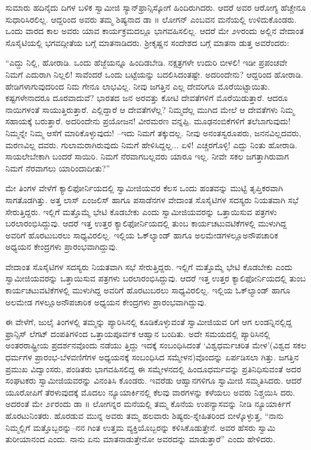  ಸುಮಾರು ಹದಿನೈದು ದಿಗಳ ಬಳಿಕ ಸ್ವಾಮೀಜಿ ಸ್ಯಾನ್​ಫ್ರಾನ್ಸಿಸ್ಕೋಗೆ ಹಿಂದಿರುಗಿದರು. ಆದರೆ ಅವರ ಆರೋಗ್ಯ ಹೆಚ್ಚೇನೂ ಸುಧಾರಿಸಿರಲಿಲ್ಲ. ಆದ್ದರಿಂದ ಅವರು ತಮ್ಮ ಶಿಷ್ಯನಾದ ಡಾ ॥ ಲೋಗನ್ ಎಂಬವನ ಮನೆಯಲ್ಲಿ ಉಳಿದುಕೊಂಡರು. ಒಂದು ವಾರದ ಕಾಲ ಅವರು ಯಾವ ಕಾರ್ಯಕ್ರಮದಲ್ಲೂ ಭಾಗವಹಿಸಲಿಲ್ಲ. ಆದರೆ ಮೇ ೨೪ರಂದು ಅಲ್ಲಿನ ವೇದಾಂತ ಸೊಸೈಟಿಯಲ್ಲಿ ಭಗವದ್ಗೀತೆಯ ಬಗ್ಗೆ ಮಾತನಾಡಿದರು. ಶ್ರೀಕೃಷ್ಣನ ಸಂದೇಶದ ಬಗ್ಗೆ ಮಾತನಾ ಡುತ್ತ ಅವರೆಂದರು:

“ಎದ್ದು ನಿಲ್ಲಿ, ಹೋರಾಡಿ. ಒಂದು ಹೆಜ್ಜೆಯನ್ನೂ ಹಿಂದಿಡಬೇಡಿ. ನಕ್ಷತ್ರಗಳೇ ಉದುರಿ ಬೀಳಲಿ! ಇಡೀ ಪ್ರಪಂಚವೇ ನಿಮಗೆ ಎದುರಾಗಿ ನಿಲ್ಲಲಿ! ಸಾವೆಂದರೆ ಒಂದು ಬಟ್ಟೆಯನ್ನು ಬದಲಿಸಿದಂತಷ್ಟೇ. ಅದರಿಂದೇನು? ಆದ್ದರಿಂದ ಹೋರಾಡಿ. ಹೇಡಿಗಳಾಗುವುದರಿಂದ ನಿಮ ಗೇನೂ ಲಾಭವಿಲ್ಲ. ನೀವು ಜಗತ್ತಿನ ಎಲ್ಲ ದೇವರಿಗೂ ಮೊರೆಯಿಟ್ಟಾಯಿತು. ಕಷ್ಟಗಳೇನಾದರೂ ದೂರವಾದುವೆ? ಭಾರತದ ಜನ ಅರವತ್ತು ಕೋಟಿ ದೇವತೆಗಳಿಗೆ ಮೊರೆಯಿಡುತ್ತಾರೆ. ಆದರೂ ನಾಯಿಗಳಂತೆ ಸಾಯುತ್ತಿರುತ್ತಾರೆ. ಎಲ್ಲಿದ್ದಾರೆ ಆ ದೇವತೆಗಳೆಲ್ಲ? ನಿಮ್ಮದೆಲ್ಲ ಮುಗಿದ ಮೇಲೆ ಆ ದೇವತೆಗಳು ನಿಮ್ಮ ಸಹಾಯಕ್ಕೆ ಬರುತ್ತಾರೆ. ಅದರಿಂದೇನು ಪ್ರಯೋಜನ! ವೀರಮರಣ ವನ್ನಪ್ಪಿ. ಮೂಢನಂಬಿಕೆಗಳಿಗೆ ತಲೆಬಾಗುವುದು! ನಿಮ್ಮನ್ನೇ ನಿಮ್ಮ ಆಸೆಗೆ ಮಾರಿಕೊಳ್ಳುವುದು! –ಇದು ನಿಮಗೆ ತಕ್ಕುದಲ್ಲ. ನೀವು ಅನಂತಸ್ವರೂಪರು, ಜನನವಿಲ್ಲದವರು, ಮರಣವಿಲ್ಲ ದವರು. ಗುಲಾಮರಾಗಿರುವುದು ನಿಮಗೆ ಹೇಳಿಸಿದ್ದಲ್ಲ... ಏಳಿ! ಎಚ್ಚರಗೊಳ್ಳಿ! ಎದ್ದು ನಿಂತು ಹೋರಾಡಿ. ಸಾಯಲೇಬೇಕಾಗಿ ಬಂದರೆ ಸಾಯಿರಿ. ನಿಮಗೆ ನೆರವಾಗಬಲ್ಲವರು ಯಾರೂ ಇಲ್ಲ. ನೀವೇ ಸಕಲ ಜಗತ್ತಾಗಿರುವಾಗ ನಿಮಗೆ ನೆರವಾಗಲು ಯಾರಿಂದಾದೀತು?”

ಮೇ ತಿಂಗಳ ವೇಳೆಗೆ ಕ್ಯಾಲಿಫೋರ್ನಿಯದಲ್ಲಿ ಸ್ವಾಮೀಜಿಯವರ ಕೆಲಸ ಒಂದು ಹಂತವನ್ನು ಮುಟ್ಟಿ ತೃಪ್ತಿಕರವಾಗಿ ಸಾಗತೊಡಗಿತ್ತು. ಅತ್ತ ಲಾಸ್ ಏಂಜಲಿಸ್ ಹಾಗೂ ಪಸಾಡೆನಗಳ ವೇದಾಂತ ಸೊಸೈಟಿಗಳ ಸದಸ್ಯರು ನಿಯತವಾಗಿ ಸಭೆ ಸೇರುತ್ತಿದ್ದರು. ಇಲ್ಲಿಗೆ ಮತ್ತೊಮ್ಮೆ ಭೇಟಿ ಕೊಡಬೇಕು ಎಂದು ಸ್ವಾಮೀಜಿಯವರನ್ನು ಒತ್ತಾಯಿಸುವ ಪತ್ರಗಳು ಬರಲಾರಂಭಿಸಿದ್ದುವು. ಆದರೆ ಇತ್ತ ಉತ್ತರ ಕ್ಯಾಲಿಫೋರ್ನಿಯದಲ್ಲಿ ತುಂಬ ಕಾರ್ಯಚಟುವಟಿಕೆಗಳಲ್ಲಿ ಮುಳುಗಿದ್ದ ಅವರಿಗೆ ಹೊರಟುಬರಲು ಸಾಧ್ಯವಿರಲಿಲ್ಲ. ಇಲ್ಲಿಯ ಓಕ್​ಲ್ಯಾಂಡ್ ಹಾಗೂ ಅಲಮೇಡಗಳಲ್ಲೂಅನೌಪಚಾರಿಕ ಅಧ್ಯಯನ ಕೇಂದ್ರಗಳು ಪ್ರಾರಂಭವಾಗಿದ್ದುವು.

\noindent

ವೇದಾಂತ ಸೊಸೈಟಿಗಳ ಸದಸ್ಯರು ನಿಯತವಾಗಿ ಸಭೆ ಸೇರುತ್ತಿದ್ದರು. ಇಲ್ಲಿಗೆ ಮತ್ತೊಮ್ಮೆ ಭೇಟಿ ಕೊಡಬೇಕು ಎಂದು ಸ್ವಾಮೀಜಿಯವರನ್ನು ಒತ್ತಾಯಿಸುವ ಪತ್ರಗಳು ಬರಲಾರಂಭಿಸಿದ್ದುವು. ಆದರೆ ಇತ್ತ ಉತ್ತರ ಕ್ಯಾಲಿಫೋರ್ನಿಯದಲ್ಲಿ ತುಂಬ ಕಾರ್ಯಚಟುವಟಿಕೆಗಳಲ್ಲಿ ಮುಳುಗಿದ್ದ ಅವರಿಗೆ ಹೊರಟುಬರಲು ಸಾಧ್ಯವಿರಲಿಲ್ಲ. ಇಲ್ಲಿಯ ಓಕ್​ಲ್ಯಾಂಡ್ ಹಾಗೂ ಅಲಮೇಡ ಗಳಲ್ಲೂಅನೌಪಚಾರಿಕ ಅಧ್ಯಯನ ಕೇಂದ್ರಗಳು ಪ್ರಾರಂಭವಾಗಿದ್ದುವು.

ಈ ವೇಳೆಗೆ, ಜುಲೈ ತಿಂಗಳಲ್ಲಿ ತಮ್ಮನ್ನು ಪ್ಯಾರಿಸಿನಲ್ಲಿ ಕೂಡಿಕೊಳ್ಳುವಂತೆ ಸ್ವಾಮೀಜಿಯವ ರಿಗೆ ಆಗ ಲಂಡನ್ನಿನಲ್ಲಿದ್ದ ಫ್ರಾನ್ಸಿಸ್ ಲೆಗಟ್ ದಂಪತಿಗಳಿಂದ ಒತ್ತಾಯಪೂರ್ವಕ ಆಹ್ವಾನ ಬಂದಿತು. ಅದೇ ಸಮಯದಲ್ಲಿ ಪ್ಯಾರಿಸಿನಲ್ಲಿ ಅಂತರರಾಷ್ಟ್ರೀಯ ಪ್ರದರ್ಶನವೊಂದು ನಡೆಯು ತ್ತಿದ್ದು ಇದಕ್ಕೆ ಸಂಬಂಧಿಸಿದಂತೆ ‘ವಿಶ್ವಧರ್ಮಚರಿತ ಮೇಳ’(ವಿಶ್ವದ ಸಕಲ ಧರ್ಮಗಳ ಪ್ರಾರಂಭ-ಬೆಳವಣಿಗೆಗಳ ಅಧ್ಯಯನಕ್ಕೆ ಸಂಬಂಧಿಸಿದ ಸಮ್ಮೇಳನ)ವೊಂದನ್ನು ಏರ್ಪಡಿಸಲಾ ಗಿತ್ತು. ಜಗತ್ತಿನ ಪ್ರಮುಖ ವಿದ್ವಾಂಸರು, ಪಂಡಿತರು ಭಾಗವಹಿಸಲಿದ್ದ ಈ ಸಮ್ಮೇಳನದಲ್ಲಿ ಹಿಂದೂಧರ್ಮವನ್ನು ಪ್ರತಿನಿಧಿಸುವಂತೆ ಅದರ ಸಂಘಟಕರು ಸ್ವಾಮೀಜಿಯವರನ್ನು ವಿನಂತಿಸಿ ಕೊಂಡರು. ಇವರೆಡು ಆಹ್ವಾನಗಳಿಗೂ ಸ್ವಾಮೀಜಿ ಸಮ್ಮತಿಸಿದರು. ಆದರೆ ಯೂರೋಪಿಗೆ ತೆರಳುವುದಕ್ಕೆ ಮೊದಲು ನ್ಯೂಯಾರ್ಕಿನಲ್ಲಿ ಕೆಲವು ವಾರಗಳನ್ನು ಕಳೆಯಲು ಅವರು ನಿಶ್ಚಯಿಸಿ ದರು. ಅದರಂತೆ ಮೇ ೨೯ರಂದು ಡಾ ॥ ಲೋಗನ್ನರ ಮನೆಯಲ್ಲಿ ತಮ್ಮ ಕೊನೆಯ ಉಪನ್ಯಾಸವನ್ನು ನೀಡಿ ನ್ಯೂಯಾರ್ಕಿಗೆ ಹೊರಟುನಿಂತರು. ಹೊರಡುವ ಮುನ್ನ ಅವರು ತಮ್ಮ ಹಲವಾರು ಶಿಷ್ಯರು-ಸ್ನೇಹಿತರಿಂದ ಬೀಳ್ಕೊಳ್ಳುತ್ತ, “ನಾನು ನಿಮ್ಮಲ್ಲಿಗೆ ಮತ್ತೊಬ್ಬರನ್ನು–ನನ ಗಿಂತ ಉತ್ತಮ ವ್ಯಕ್ತಿಯೊಬ್ಬರನ್ನು ಕಳಿಸಿಕೊಡುತ್ತೇನೆ. ಅವರ ಹೆಸರು ಸ್ವಾಮಿ ತುರೀಯಾನಂದ ಎಂದು. ನಾನು ಏನು ಮಾತನಾಡುತ್ತೇನೋ ಅವರದನ್ನು ಮಾಡುತ್ತಾರೆ” ಎಂದು ಹೇಳಿದರು.

